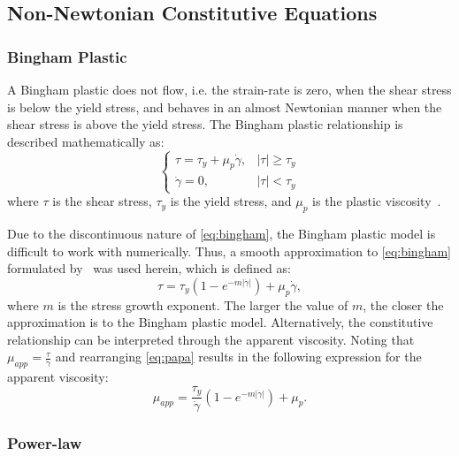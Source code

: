 \subsection{Non-Newtonian Constitutive Equations}

\subsubsection{Bingham Plastic} \label{sec:bp}

A Bingham plastic does not flow, i.e. the strain-rate is zero, when the shear stress is below the yield stress, and behaves in an almost Newtonian manner when the shear stress is above the yield stress.
The Bingham plastic relationship is described mathematically as:
\begin{equation} \label{eq:bingham}
\begin{cases}
\tau = \tau_y + \mu_p \dot{\gamma}, & |\tau| \geq \tau_y \\
\dot{\gamma} = 0, & |\tau| < \tau_y
\end{cases}
\end{equation}
\noindent where $\tau$ is the shear stress, $\tau_y$ is the yield stress, and $\mu_p$ is the plastic viscosity~\cite{bingham1922fluidity}.

Due to the discontinuous nature of \eqref{eq:bingham}, the Bingham plastic model is difficult to work with numerically.
Thus, a smooth approximation to \eqref{eq:bingham} formulated by~\citet{papanastasiou1987flows} was used herein, which is defined as:
\begin{equation} \label{eq:papa}
\tau = \tau_y (1 - e^{-m |\dot{\gamma}|}) + \mu_p \dot{\gamma},
\end{equation}
\noindent where $m$ is the stress growth exponent.
The larger the value of $m$, the closer the approximation is to the Bingham plastic model.
Alternatively, the constitutive relationship can be interpreted through the apparent viscosity.
Noting that $\mu_{app} = \frac{\tau}{\dot{\gamma}}$ and rearranging \eqref{eq:papa} results in the following expression for the apparent viscosity:
\begin{equation} \label{eq:bing-mu-app}
\mu_{app} = \frac{\tau_y}{\dot{\gamma}} (1 - e^{-m |\dot{\gamma}|}) + \mu_p.
\end{equation}

\subsubsection{Power-law}

